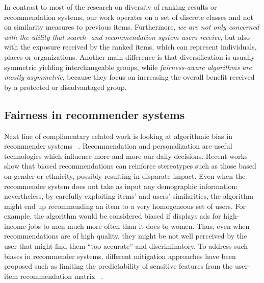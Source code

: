 In contrast to most of the research on diversity of ranking results or recommendation systems, our work operates on a set of discrete classes and not on similarity measures to previous items.
%
Furthermore, \emph{we are not only concerned with the utility that search- and recommendation system users receive}, but also with the exposure received by the ranked items, which can represent individuals, places or organizations.
%
Another main difference is that diversification is usually symmetric yielding interchangeable groups, while \emph{fairness-aware algorithms are mostly asymmetric}, because they focus on increasing the overall benefit received by a protected or disadvantaged group.

\subsection{Fairness in recommender systems}
Next line of complimentary related work is looking at algorithmic bias in recommender systems ~\cite{chakraborty2019equality, ekstrand2021exploring, jannach2015recommenders, burke2018balanced, kamishima2018recommendation, steck2018calibrated, yao2017beyond, zhu2018fairness, edizel2020fairecsys}. Recommendation and personalization are
useful technologies which influence more and more our
daily decisions. Recent works show that biased recommendations can reinforce stereotypes
such as those based on gender or ethnicity, possibly resulting in disparate impact. Even when the recommender system does not take as input any demographic information: nevertheless, by carefully exploiting items' and users'
similarities, the algorithm might end up recommending
an item to a very homogeneous set of users. For example, the algorithm would be considered biased if
displays ads for high-income jobs to men much more
often than it does to women. Thus, even when recommendations are of high quality, they might be not
well perceived by the user that might find them “too
accurate” and discriminatory. To address such biases in recommender systems, different mitigation approaches have been proposed such as
limiting the predictability of sensitive features from the
user-item recommendation matrix ~\cite{kamishima2018recommendation, edizel2020fairecsys}.